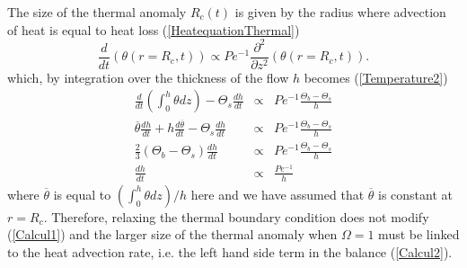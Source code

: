 The size of the thermal anomaly  $R_c(t)$ is given by the radius where
advection of heat is equal to heat loss (\ref{HeatequationThermal})
\begin{equation}
  \frac{d}{d    t}\left(\theta(r=   R_c,t)\right)    \propto   Pe^{-1}
  \frac{\partial^2}{\partial z^2}\left(\theta(r=R_c,t)\right).
  \label{C4-HeatequationThermal}
\end{equation}
which,  by integration  over the  thickness  of the  flow $h$  becomes
(\ref{Temperature2})
\begin{eqnarray}
  \frac{d}{dt}\left(\int_0^h\theta           dz\right)-\Theta_s\frac{d
  h}{dt}&\propto& Pe^{-1} \frac{\Theta_b-\Theta_s}{h}\nonumber\\
  \overline{\theta}\frac{d h}{dt}+h\frac{d \overline{\theta}}{dt}-\Theta_s\frac{d
  h}{dt}&\propto& Pe^{-1}
                  \frac{\Theta_b-\Theta_s}{h}\nonumber\\
  \frac{2}{3}\left(\Theta_b-\Theta_s\right)\frac{d  h}{d   t}&\propto& Pe^{-1}
                                                                       \frac{\Theta_b-\Theta_s}{h}\nonumber\\
  \frac{d h}{d t}&\propto& \frac{Pe^{-1}}{h}\label{Calcul2}
\end{eqnarray}
where $\overline{\theta}$  is equal  to $(\int_0^h \theta  dz)/h$ here
and  we   have  assumed   that  $\overline{\theta}$  is   constant  at
$r=R_c$. Therefore,  relaxing the thermal boundary  condition does not
modify (\ref{Calcul1}) and the larger size of the thermal anomaly when
$\Omega=1$ must be  linked to the heat advection rate,  i.e.  the left
hand side term in the balance (\ref{Calcul2}).


